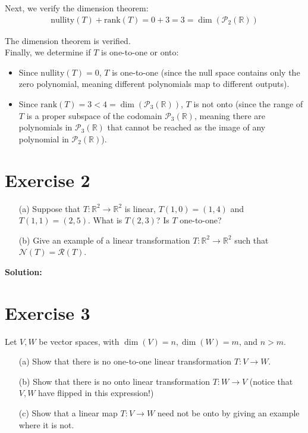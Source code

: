 \documentclass{article}
\begin{document}
Next, we verify the dimension theorem:
\begin{align*}
    \text{nullity}(T) + \text{rank}(T) = 0 + 3 = 3 = \dim(\mathcal{P}_2(\mathbb{R}))
\end{align*}

The dimension theorem is verified. \\

Finally, we determine if $T$ is one-to-one or onto:
\begin{itemize}
    \item Since $\text{nullity}(T) = 0$, $T$ is one-to-one (since the null space contains only the zero polynomial, meaning different polynomials map to different outputs).
    \item Since $\text{rank}(T) = 3 < 4 = \dim(\mathcal{P}_3(\mathbb{R}))$, $T$ is not onto (since the range of $T$ is a proper subspace of the codomain $\mathcal{P}_3(\mathbb{R})$, meaning there are polynomials in $\mathcal{P}_3(\mathbb{R})$ that cannot be reached as the image of any polynomial in $\mathcal{P}_2(\mathbb{R})$).
\end{itemize}

\newpage

\section*{Exercise 2}
\begin{itemize}
    \item[(a)] Suppose that $T : \mathbb{R}^2 \to \mathbb{R}^2$ is linear, $T(1,0) = (1,4)$ and $T(1,1) = (2,5)$. What is $T(2,3)$? Is $T$ one-to-one?

    \item[(b)] Give an example of a linear transformation $T : \mathbb{R}^2 \to \mathbb{R}^2$ such that $\mathcal{N}(T) = \mathcal{R}(T)$.
\end{itemize}

\textbf{Solution: }\\



\newpage

\section*{Exercise 3}
Let $V,W$ be vector spaces, with $\dim(V) = n, \dim(W) = m$, and $n > m$.

\begin{itemize}
    \item[(a)] Show that there is no one-to-one linear transformation $T : V \to W$.

    \item[(b)] Show that there is no onto linear transformation $T : W \to V$ (notice that $V,W$ have flipped in this expression!)

    \item[(c)] Show that a linear map $T : V \to W$ need not be onto by giving an example where it is not.
\end{itemize}
\end{document}
